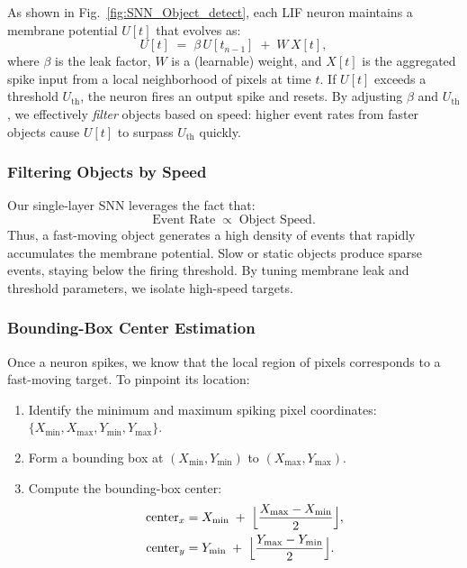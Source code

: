 As shown in Fig.~\ref{fig:SNN_Object_detect}, each LIF neuron maintains a membrane potential $U[t]$ that evolves as:
\begin{equation} \label{lif_eq}
    U[t] \;=\; \beta \, U[t_{n-1}] \;+\; W \, X[t],
\end{equation}
where $\beta$ is the leak factor, $W$ is a (learnable) weight, and $X[t]$ is the aggregated spike input from a local neighborhood of pixels at time $t$. If $U[t]$ exceeds a threshold $U_{\text{th}}$, the neuron fires an output spike and resets. By adjusting $\beta$ and $U_{\text{th}}$, we effectively \emph{filter} objects based on speed: higher event rates from faster objects cause $U[t]$ to surpass $U_{\text{th}}$ quickly.

\subsubsection{Filtering Objects by Speed}
\label{sec:speed_filter}

Our single-layer SNN leverages the fact that:
\[
\text{Event Rate} \;\propto\; \text{Object Speed}.
\]
Thus, a fast-moving object generates a high density of events that rapidly accumulates the membrane potential. Slow or static objects produce sparse events, staying below the firing threshold. By tuning membrane leak and threshold parameters, we isolate high-speed targets.

\subsubsection{Bounding-Box Center Estimation}
\label{find_centre}

Once a neuron spikes, we know that the local region of pixels corresponds to a fast-moving target. To pinpoint its location:

\begin{enumerate}
    \item Identify the minimum and maximum spiking pixel coordinates: $\{X_{\min}, X_{\max}, Y_{\min}, Y_{\max}\}$.
    \item Form a bounding box at $(X_{\min},Y_{\min})$ to $(X_{\max},Y_{\max})$.
    \item Compute the bounding-box center:
    \begin{subequations}
    \label{eq:center}
    \begin{align}
        \text{center}_x 
        &= 
        X_{\min} \;+\; \Bigl\lfloor\frac{X_{\max} - X_{\min}}{2}\Bigr\rfloor,\\
        \text{center}_y 
        &= 
        Y_{\min} \;+\; \Bigl\lfloor\frac{Y_{\max} - Y_{\min}}{2}\Bigr\rfloor.
    \end{align}
    \end{subequations}
\end{enumerate}


